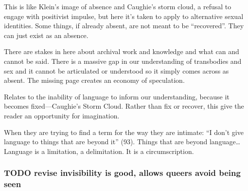 \documentclass[11pt]{article}
\begin{document}
This is like Klein's image of absence and Caughie's storm cloud, a refusal to engage with positivist impulse, but here it's taken to apply to alternative sexual identities. Some things, if already absent, are not meant to be “recovered”. They can just exist as an absence.

There are stakes in here about archival work and knowledge and what can and cannot be said. There is a massive gap in our understanding of transbodies and sex and it cannot be articulated or understood so it simply comes across as absent. The missing page creates an economy of speculation.

Relates to the inability of language to inform our understanding, because it becomes fixed---Caughie’s Storm Cloud. Rather than fix or recover, this give the reader an opportunity for imagination.

When they are trying to find a term for the way they are intimate: “I
don’t give language to things that are beyond it” (93). Things that are beyond language\ldots{} Language is a limitation, a delimitation. It is a circumscription.

\subsubsection{{\bfseries\sffamily TODO} revise invisibility is good, allows queers avoid being seen}
\label{sec:org288102c}
\end{document}

